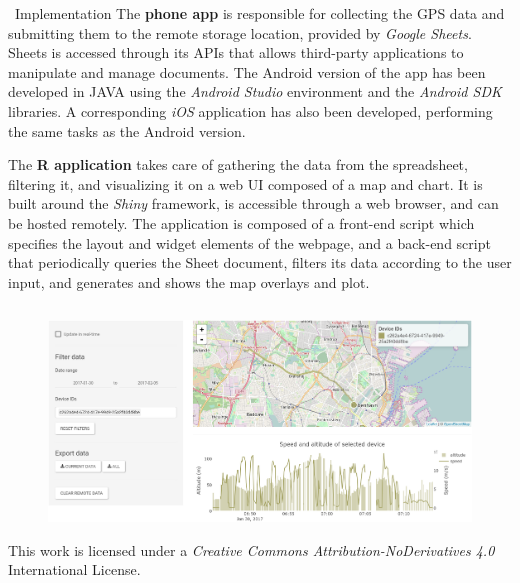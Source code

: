 \documentclass[final]{beamer}
\newlength{\onecolwid}
\newlength{\twocolwid}
\begin{document}
\begin{frame}[t]
\begin{columns}[t]
\begin{column}{\twocolwid}
\begin{columns}[t, totalwidth=\twocolwid]
\begin{column}{\onecolwid}
\begin{block}{\faCode \, Implementation}
				The \textbf{phone app} is responsible for collecting the GPS data and submitting them to the remote storage location, provided by \emph{Google Sheets}.
				Sheets is accessed through its APIs that allows third-party applications to manipulate and manage documents.
				The Android version of the app has been developed in JAVA using the \emph{Android Studio} environment and the \emph{Android SDK} libraries.
				A corresponding \emph{iOS} application has also been developed, performing the same tasks as the Android version.


				\vspace{.3in}
				The \textbf{R application} takes care of gathering the data from the spreadsheet, filtering it, and visualizing it on a web UI composed of a map and chart.
				It is built around the \emph{Shiny} framework, is accessible through a web browser, and can be hosted remotely.
				The application is composed of a front-end script which specifies the layout and widget elements of the webpage, and a back-end script that periodically queries the Sheet document, filters its data according to the user input, and generates and shows the map overlays and plot.
			\end{block}
		\end{column}
	\end{columns}

	\vspace{-1cm}
	\begin{figure}
		\includegraphics[width=\twocolwid]{ss_ui.png}
	\end{figure}

	\vspace{2cm}
	\begin{center}
		{\small{This work is licensed under a \emph{Creative Commons Attribution-NoDerivatives 4.0} International License.}}\\
		\ccbynd
	\end{center}
\end{column}


\end{columns}
\end{frame}
\end{document}
